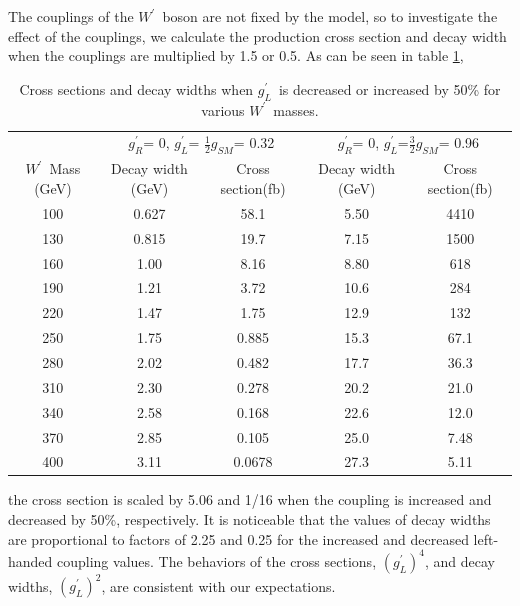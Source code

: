 \documentclass[preprint,showpacs,preprintnumbers]{revtex4}
\newcommand{\wprime}{\ensuremath{W^\prime}~}
\newcommand{\gR}{\ensuremath{g^\prime_R}}
\newcommand{\gL}{\ensuremath{g^\prime_L}}
\newcommand{\gSM}{\ensuremath{g_{\scriptscriptstyle SM}}}
\begin{document}
The couplings of the \wprime boson are not fixed by the model, so to investigate the effect of the couplings, we calculate the production cross section and decay width when the couplings are multiplied by 1.5 or 0.5. As can be seen in table \ref{tab:XsecgLVar}, 
\begin{table}[htb]
	\centering
	\caption{Cross sections and decay widths when \gL ~is decreased or increased by 50\% for various \wprime masses. \label{tab:XsecgLVar} }
	\begin{tabular}{|c|c|c|c|c|}
		\hline 
		& \multicolumn{2}{c|}{\gR = 0, \gL = $\frac{1}{2}$\gSM = 0.32}
		& \multicolumn{2}{c|}{\gR = 0, \gL =$\frac{3}{2}$\gSM = 0.96}\\\cline{2-5}
		\wprime Mass (GeV)  &  Decay width (GeV) &  Cross section(fb)&  Decay width (GeV) &  Cross section(fb)\\
		\hline 
		100& 0.627 & 58.1  & 5.50 & 4410\\
		130& 0.815 & 19.7  & 7.15 & 1500\\
		160& 1.00  & 8.16  & 8.80 & 618\\
		190& 1.21  & 3.72  & 10.6 & 284\\
		220& 1.47  & 1.75  & 12.9 & 132\\
		250& 1.75  & 0.885 & 15.3 & 67.1\\
		280& 2.02  & 0.482 & 17.7 & 36.3\\
		310& 2.30  & 0.278 & 20.2 & 21.0\\
		340& 2.58  & 0.168 & 22.6 & 12.0\\
		370& 2.85  & 0.105 & 25.0 & 7.48\\
		400& 3.11  & 0.0678& 27.3 & 5.11\\    
		\hline
	\end{tabular}
\end{table}  
the cross section is scaled by 5.06 and 1/16 when the coupling is increased and decreased by 50\%, respectively. It is noticeable that the values of decay widths are proportional to  factors of 2.25 and  0.25 for the increased  and decreased left-handed coupling values. The behaviors of the cross sections, $(\gL)^4$, and decay widths, $(\gL)^2$, are consistent with our expectations.
\end{document}
